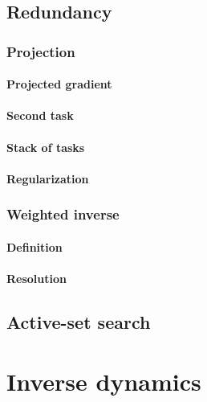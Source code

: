 \documentclass{book}
\begin{document}
\chapter{Redundancy}

\section{Projection}
\subsection{Projected gradient}
\subsection{Second task}
\subsection{Stack of tasks}
\subsection{Regularization}

\section{Weighted inverse}
\subsection{Definition}
\subsection{Resolution}


\chapter{Active-set search}

\part{Inverse dynamics}
\end{document}
